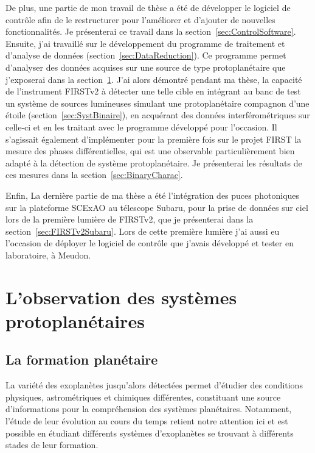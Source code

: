 De plus, une partie de mon travail de thèse a été de développer le logiciel de contrôle afin de le restructurer pour l'améliorer et d'ajouter de nouvelles fonctionnalités. Je présenterai ce travail dans la section~\ref{sec:ControlSoftware}. Ensuite, j'ai travaillé sur le développement du programme de traitement et d'analyse de données (section~\ref{sec:DataReduction}). Ce programme permet d'analyser des données acquises sur une source de type protoplanétaire que j'exposerai dans la section~\ref{sec:Protoplanetes}. J'ai alors démontré pendant ma thèse, la capacité de l'instrument \ac{FIRSTv2} à détecter une telle cible en intégrant au banc de test un système de sources lumineuses simulant une protoplanétaire compagnon d'une étoile (section~\ref{sec:SystBinaire}), en acquérant des données interférométriques sur celle-ci et en les traitant avec le programme développé pour l'occasion. Il s'agissait également d'implémenter pour la première fois sur le projet \ac{FIRST} la mesure des phases différentielles, qui est une observable particulièrement bien adapté à la détection de système protoplanétaire. Je présenterai les résultats de ces mesures dans la section~\ref{sec:BinaryCharac}. 

Enfin, La dernière partie de ma thèse a été l'intégration des puces photoniques sur la plateforme \ac{SCExAO} au télescope Subaru, pour la prise de données sur ciel lors de la première lumière de \ac{FIRSTv2}, que je présenterai dans la section~\ref{sec:FIRSTv2Subaru}. Lors de cette première lumière j'ai aussi eu l'occasion de déployer le logiciel de contrôle que j'avais développé et tester en laboratoire, à Meudon.


\section{L'observation des systèmes protoplanétaires}
\label{sec:Protoplanetes}

\subsection{La formation planétaire}

La variété des exoplanètes jusqu'alors détectées permet d'étudier des conditions physiques, astrométriques et chimiques différentes, constituant une source d'informations pour la compréhension des systèmes planétaires. Notamment, l'étude de leur évolution au cours du temps retient notre attention ici et est possible en étudiant différents systèmes d'exoplanètes se trouvant à différents stades de leur formation. 

